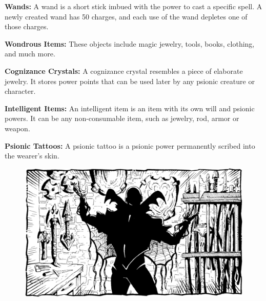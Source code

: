 \textbf{Wands:} A wand is a short stick imbued with the power to cast a specific spell. A newly created wand has 50 charges, and each use of the wand depletes one of those charges.

\textbf{Wondrous Items:} These objects include magic jewelry, tools, books, clothing, and much more.

\textbf{Cognizance Crystals:} A cognizance crystal resembles a piece of elaborate jewelry. It stores power points that can be used later by any psionic creature or character.

\textbf{Intelligent Items:} An intelligent item is an item with its own will and psionic powers. It can be any non-consumable item, such as jewelry, rod, armor or weapon.

\textbf{Psionic Tattoos:} A psionic tattoo is a psionic power permanently scribed into the wearer's skin.

\begin{figure}[t!]
\centering
\includegraphics[width=\textwidth-1cm]{images/weapons-1.png}
\WOTC
\end{figure}















